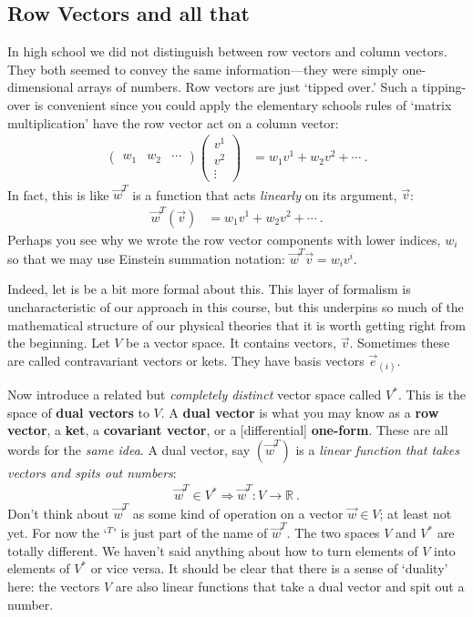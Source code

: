  

\subsection{Row Vectors and all that}

In high school we did not distinguish between row vectors and column vectors. They both seemed to convey the same information---they were simply one-dimensional arrays of numbers. Row vectors are just `tipped over.’ Such a tipping-over is convenient since you could apply the elementary schools rules of `matrix multiplication' have the row vector act on a column vector:
\begin{align}
  \begin{pmatrix}
    w_1 & w_2 & \cdots
  \end{pmatrix}
  \begin{pmatrix}
    v^1 \\
    v^2 \\
    \vdots
  \end{pmatrix}
  &= 
  w_1 v^1 + w_2 v^2 + \cdots \ .
\end{align}
In fact, this is like $\vec{w}^T$ is a function that acts \emph{linearly} on its argument, $\vec{v}$: 
\begin{align}
  \vec{w}^T(\vec v) &= w_1 v^1 + w_2 v^2 + \cdots \ .
  \label{eq:oneform:eats:vector}
\end{align}
Perhaps you see why we wrote the row vector components with lower indices, $w_i$ so that we may use Einstein summation notation: $\vec{w}^T\vec{v} = w_iv^i$.

Indeed, let is be a bit more formal about this. This layer of formalism is uncharacteristic of our approach in this course, but this underpins so much of the mathematical structure of our physical theories that it is worth getting right from the beginning. 
%
Let $V$ be a vector space. It contains vectors, $\vec{v}$. Sometimes these are called contravariant vectors or kets. They have basis vectors $\vec{e}_{(i)}$. 

Now introduce a related but \emph{completely distinct} vector space called $V^*$. This is the space of \textbf{dual vectors} to $V$. A \textbf{dual vector} is what you may know as a \textbf{row vector}, a \textbf{ket}, a \textbf{covariant vector}, or a [differential] \textbf{one-form}. These are all words for the \emph{same idea}. A dual vector, say $(\vec{w}^T)$ is a \emph{linear function that takes vectors and spits out numbers}:
\begin{align}
  \vec{w}^T \in V^* \Rightarrow \vec{w}^T: V \to \mathbb{R} \ .
 \end{align}
Don’t think about $\vec{w}^T$ as some kind of operation on a vector $\vec{w}\in V$; at least not yet. For now the `$^T$' is just part of the name of $\vec{w}^T$. The two spaces $V$ and $V^*$ are totally different. We haven’t said anything about how to turn elements of $V$ into elements of $V^*$ or vice versa.
%
It should be clear that there is a sense of `duality’ here: the vectors $V$ are also linear functions that take a dual vector and spit out a number. 

